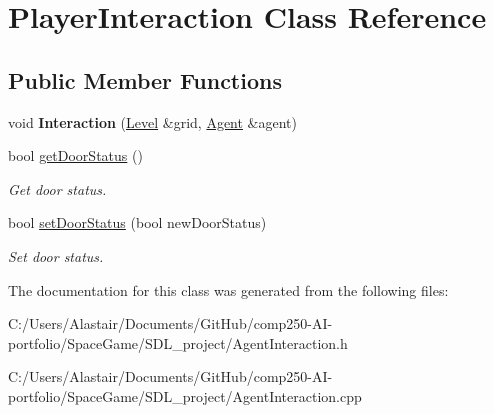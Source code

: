 \hypertarget{class_player_interaction}{}\section{Player\+Interaction Class Reference}
\label{class_player_interaction}
\subsection*{Public Member Functions}
\begin{DoxyCompactItemize}
\item 
\mbox{\label{class_player_interaction_a207b6d70549eee8a04669cafdd32b34b}} 
void {\bfseries Interaction} (\hyperlink{class_level}{Level} \&grid, \hyperlink{class_agent}{Agent} \&agent)
\item 
\mbox{\label{class_player_interaction_a9f3d8145f18c2dc0c1dcaae55ad02b02}} 
bool \hyperlink{class_player_interaction_a9f3d8145f18c2dc0c1dcaae55ad02b02}{get\+Door\+Status} ()
\begin{DoxyCompactList}\small\item\em Get door status. \end{DoxyCompactList}\item 
\mbox{\label{class_player_interaction_a896e8a5f3c2312ac2050419ebd0704d9}} 
bool \hyperlink{class_player_interaction_a896e8a5f3c2312ac2050419ebd0704d9}{set\+Door\+Status} (bool new\+Door\+Status)
\begin{DoxyCompactList}\small\item\em Set door status. \end{DoxyCompactList}\end{DoxyCompactItemize}


The documentation for this class was generated from the following files\+:\begin{DoxyCompactItemize}
\item 
C\+:/\+Users/\+Alastair/\+Documents/\+Git\+Hub/comp250-\/\+A\+I-\/portfolio/\+Space\+Game/\+S\+D\+L\+\_\+project/Agent\+Interaction.\+h\item 
C\+:/\+Users/\+Alastair/\+Documents/\+Git\+Hub/comp250-\/\+A\+I-\/portfolio/\+Space\+Game/\+S\+D\+L\+\_\+project/Agent\+Interaction.\+cpp\end{DoxyCompactItemize}
